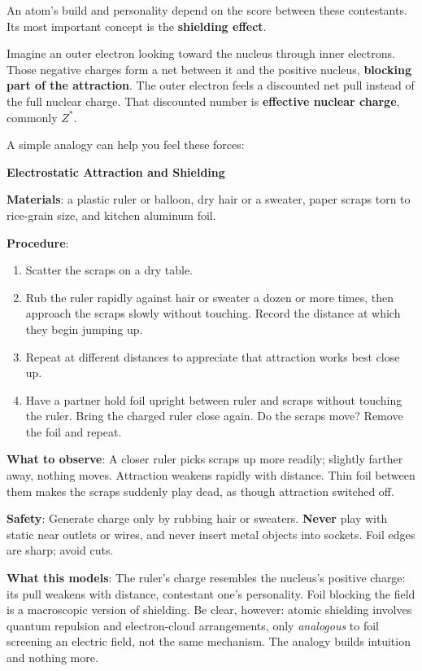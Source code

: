 An atom's build and personality depend on the score between these contestants. Its most important concept is the \textbf{shielding effect}.

Imagine an outer electron looking toward the nucleus through inner electrons. Those negative charges form a net between it and the positive nucleus, \textbf{blocking part of the attraction}. The outer electron feels a discounted net pull instead of the full nuclear charge. That discounted number is \textbf{effective nuclear charge}, commonly $Z^{*}$.

A simple analogy can help you feel these forces:

\begin{shiyan}
\textbf{Electrostatic Attraction and Shielding}

\textbf{Materials}: a plastic ruler or balloon, dry hair or a sweater, paper scraps torn to rice-grain size, and kitchen aluminum foil.

\textbf{Procedure}:
\begin{enumerate}[itemsep=1pt]
\item Scatter the scraps on a dry table.
\item Rub the ruler rapidly against hair or sweater a dozen or more times, then approach the scraps slowly without touching. Record the distance at which they begin jumping up.
\item Repeat at different distances to appreciate that attraction works best close up.
\item Have a partner hold foil upright between ruler and scraps without touching the ruler. Bring the charged ruler close again. Do the scraps move? Remove the foil and repeat.
\end{enumerate}

\textbf{What to observe}: A closer ruler picks scraps up more readily; slightly farther away, nothing moves. Attraction weakens rapidly with distance. Thin foil between them makes the scraps suddenly play dead, as though attraction switched off.

\textbf{Safety}: Generate charge only by rubbing hair or sweaters. \textbf{Never} play with static near outlets or wires, and never insert metal objects into sockets. Foil edges are sharp; avoid cuts.

\textbf{What this models}: The ruler's charge resembles the nucleus's positive charge: its pull weakens with distance, contestant one's personality. Foil blocking the field is a macroscopic version of shielding. Be clear, however: atomic shielding involves quantum repulsion and electron-cloud arrangements, only \emph{analogous} to foil screening an electric field, not the same mechanism. The analogy builds intuition and nothing more.
\end{shiyan}

